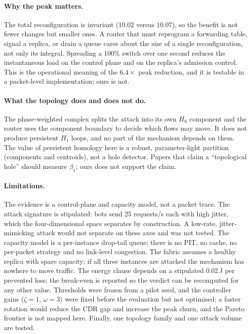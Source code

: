 \documentclass[10pt,a4paper]{article}
\begin{document}
\paragraph{Why the peak matters.}
The total reconfiguration is invariant ($10.02$ versus $10.07$), so the benefit is
not fewer changes but smaller ones. A router that must reprogram a forwarding
table, signal a replica, or drain a queue cares about the size of a single
reconfiguration, not only its integral. Spreading a $100\%$ switch over one
second reduces the instantaneous load on the control plane and on the replica's
admission control. This is the operational meaning of the $6.4\times$ peak
reduction, and it is testable in a packet-level implementation; ours is not.

\paragraph{What the topology does and does not do.}
The phase-weighted complex splits the attack into its own $H_0$ component and the
router uses the component boundary to decide which flows may move. It does not
produce persistent $H_1$ loops, and no part of the mechanism depends on them. The
value of persistent homology here is a robust, parameter-light partition
(components and centroids), not a hole detector. Papers that claim a
``topological hole'' should measure $\beta_1$; ours does not support the claim.

\paragraph{Limitations.}
The evidence is a control-plane and capacity model, not a packet trace. The
attack signature is stipulated: bots send 25 requests/s each with high jitter,
which the four-dimensional space separates by construction. A low-rate,
jitter-mimicking attack would not separate on these axes and was not tested. The
capacity model is a per-instance drop-tail queue; there is no PIT, no cache, no
per-packet strategy and no link-level congestion. The fabric assumes a healthy
replica with spare capacity; if all three instances are attacked the mechanism has
nowhere to move traffic. The energy clause depends on a stipulated 0.02\,J per
prevented loss; the break-even is reported so the verdict can be recomputed for
any other value. Thresholds were frozen from a pilot seed, and the controller
gains ($\zeta=1$, $\omega=3$) were fixed before the evaluation but not optimised;
a faster rotation would reduce the CDR gap and increase the peak churn, and the
Pareto frontier is not mapped here. Finally, one topology family and one attack
volume are tested.
\end{document}
